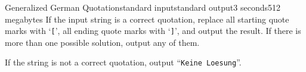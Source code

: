 \begin{problem}{Generalized German Quotation}{standard input}{standard output}{3 seconds}{512 megabytes}
\OutputFile
If the input string is a correct quotation, replace all starting quote marks with `\verb![!', all ending quote marks with `\verb!]!', and output the result. If there is more than one possible solution, output any of them.

If the string is not a correct quotation, output ``\verb!Keine Loesung!''.


\Examples

\begin{example}
\exmp{{<}{<}{>}{>}{<}{<}{<}{<}{>}{>}{>}{>}
}{[][[]]
}%
\exmp{{>}{>}{<}{<}{>}{>}{>}{>}{<}{<}{<}{<}{<}{<}{>}{>}{>}{>}{<}{<}
}{[][[]][][]
}%
%
\end{example}

\end{problem}

